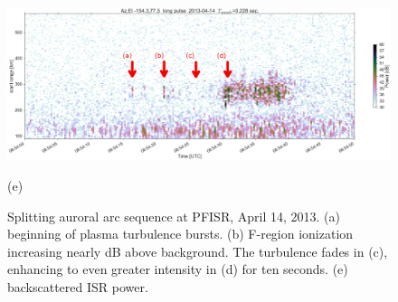 \begin{figure}
    \begin{center}
    \includegraphics[width=0.9\columnwidth,trim=10 0 0 185,clip]{gfx/2013-04-14T0854/power_longpulse2013-04-1408-54}\\
    \end{center}
    
    \vspace{-1.5cm}
    (e) 
    \vspace{.5cm}
      
    \caption{Splitting auroral arc sequence at PFISR, April 14, 2013. 
        (a) beginning of plasma turbulence bursts.
        (b) F-region ionization increasing nearly \unit[30]{dB} above background. 
        The turbulence fades in (c), enhancing to even greater intensity in (d) for ten seconds.
        (e) backscattered ISR power.}
    \label{fig:20130414T0854a}
\end{figure} 

